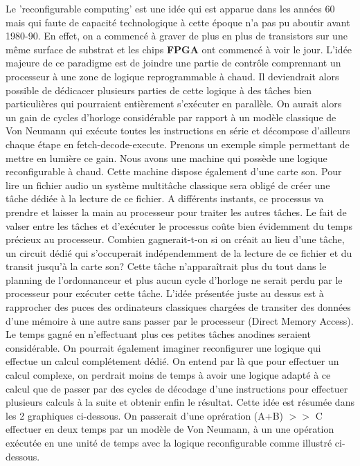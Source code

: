 \vspace{15px}
Le 'reconfigurable computing' est une idée qui est apparue dans les années 60 mais qui faute de capacité technologique à cette époque n'a pas pu aboutir avant 1980-90. En effet, on a commencé à graver de plus en plus de transistors sur une même surface de substrat et les chips {\bf FPGA} ont commencé à voir le jour.
L'idée majeure de ce paradigme est de joindre une partie de contrôle comprennant un processeur à une zone de logique reprogrammable à chaud. Il deviendrait alors possible de dédicacer plusieurs parties de cette logique à des tâches bien particulières qui pourraient entièrement s’exécuter en parallèle. On aurait alors un gain de cycles d'horloge considérable par rapport à un modèle classique de Von Neumann qui exécute toutes les instructions en série et décompose d'ailleurs chaque étape en fetch-decode-execute.
\medskip
Prenons un exemple simple permettant de mettre en lumière ce gain. Nous avons une machine qui possède une logique reconfigurable à chaud. Cette machine dispose également d'une carte son. Pour lire un fichier audio un système multitâche classique sera obligé de créer une tâche dédiée à la lecture de ce fichier. A différents instants, ce processus va prendre et laisser la main au processeur pour traiter les autres tâches. Le fait de valser entre les tâches et d'exécuter le processus coûte bien évidemment du temps précieux au processeur. Combien gagnerait-t-on si on créait au lieu d'une tâche, un circuit dédié qui s'occuperait indépendemment de la lecture de ce fichier et du transit jusqu'à la carte son?
\medskip
Cette tâche n'apparaîtrait plus du tout dans le planning de l'ordonnanceur et plus aucun cycle d'horloge ne serait perdu par le processeur pour exécuter cette tâche. L'idée présentée juste au dessus est à rapprocher des puces des ordinateurs classiques chargées de transiter des données d'une mémoire à une autre sans passer par le processeur (Direct Memory Access).
\medskip
Le temps gagné en n'effectuant plus ces petites tâches anodines seraient considérable. On pourrait également imaginer reconfigurer une logique qui effectue un calcul complétement dédié. On entend par là que pour effectuer un calcul complexe, on perdrait moins de temps à avoir une logique adapté à ce calcul que de passer par des cycles de décodage d'une instructions pour effectuer plusieurs calculs à la suite et obtenir enfin le résultat. Cette idée est résumée dans les 2 graphiques ci-dessous.
\medskip
On passerait d'une oprération (A+B) $>>$ C effectuer en deux temps par un modèle de Von Neumann, à un une opération exécutée en une unité de temps avec la logique reconfigurable comme illustré ci-dessous.
